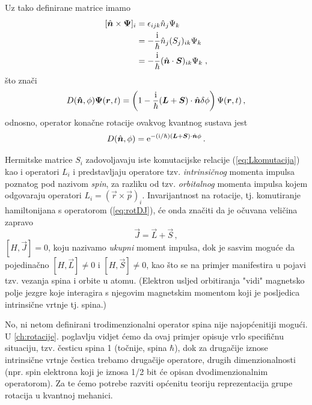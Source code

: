 Uz tako definirane matrice imamo
\begin{equation}
\begin{split}
[\hat{\vec{n}}\times\vec{\Psi}]_i &=
\epsilon_{ijk}\hat{n}_j\Psi_k \\
&= -\frac{\rmi}{\hbar}\hat{n}_j (S_j)_{ik}\Psi_k\\
&= -\frac{\rmi}{\hbar}(\hat{\vec{n}}\cdot\vec{S})_{ik}\Psi_k \;,
\end{split}
\end{equation}
što znači
\begin{equation*}
D(\vec{\hat{n}},\phi)\vec{\Psi}(\vec{r}, t)=
 \left(1-\frac{\rmi}{\hbar}(\vec{L}+\vec{S})\cdot\hat{\vec{n}}\delta\phi \right)
  \Psi(\vec{r}, t) \,,
\end{equation*}
odnosno, operator konačne rotacije ovakvog kvantnog sustava jest
\begin{equation}
D(\hat{\vec{n}}, \phi)=
 \rme^{-(\rmi/\hbar)(\vec{L}+\vec{S})\cdot\hat{\vec{n}}\phi} \,.
 \label{eq:rotDJ}
\end{equation}

Hermitske matrice $S_i$ zadovoljavaju iste komutacijske relacije
(\ref{eq:Lkomutacija}) kao i operatori $L_i$ i predstavljaju operatore tzv.
\emph{intrinsičnog}  momenta impulsa poznatog pod nazivom \emph{spin},
za razliku od tzv. \emph{orbitalnog} momenta impulsa kojem odgovaraju
operatori $L_i = (\vec{r}\times\vec{p})_{i}$.
   
 
Invarijantnost na rotacije, tj. komutiranje hamiltonijana s operatorom
(\ref{eq:rotDJ}), će onda značiti da je očuvana veličina zapravo
\begin{equation}
\vec{J}=\vec{L}+\vec{S} \,,
\end{equation}
$[H, \vec{J}] = 0$, koju nazivamo \emph{ukupni} moment impulsa, dok je sasvim moguće
da pojedinačno $[H, \vec{L}] \neq 0$ i $[H, \vec{S}] \neq 0$, kao što se na
primjer manifestira u pojavi tzv. vezanja spina i orbite u atomu.
(Elektron usljed orbitiranja "vidi" magnetsko polje
jezgre koje interagira s njegovim magnetskim momentom koji je posljedica
intrinsične vrtnje tj. spina.)

No, ni netom definirani trodimenzionalni operator spina nije najopćenitiji mogući.
U \ref{ch:rotacije}. poglavlju vidjet ćemo da ovaj primjer opisuje
vrlo specifičnu situaciju, tzv. česticu spina 1 (točnije, spina $\hbar$),
dok za drugačije iznose intrinsične vrtnje čestica trebamo drugačije
operatore, drugih dimenzionalnosti (npr. spin elektrona koji je iznosa 1/2 
bit će opisan dvodimenzionalnim operatorom).
Za te ćemo potrebe razviti općenitu teoriju
reprezentacija grupe rotacija u kvantnoj mehanici.


